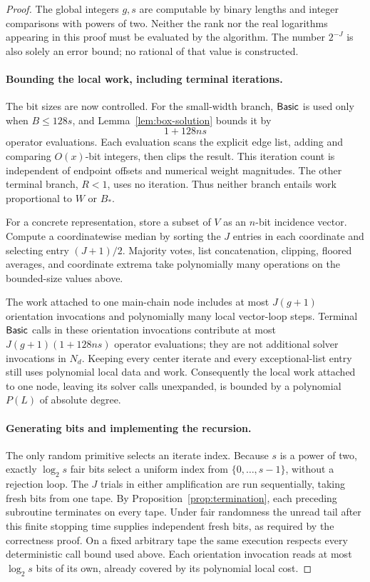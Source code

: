 \begin{proof}
The global integers \(g,s\) are computable by binary lengths and
integer comparisons with powers of two. Neither the rank nor the
real logarithms appearing in this proof must be evaluated by the
algorithm. The number \(2^{-J}\) is also solely an error bound;
no rational of that value is constructed.

\paragraph{Bounding the local work, including terminal iterations.}
The bit sizes are now controlled. For the small-width branch,
\(\mathsf{Basic}\) is used only when \(B\le128s\), and
Lemma~\ref{lem:box-solution} bounds it by
\[
                         1+128ns
\]
operator evaluations. Each evaluation scans the explicit edge list,
adding and comparing \(O(x)\)-bit integers, then clips the result.
This iteration count is independent of endpoint offsets and numerical
weight magnitudes. The other terminal branch, \(R<1\), uses no
iteration. Thus neither branch entails work proportional to \(W\)
or \(B_*\).

For a concrete representation, store a subset of \(V\) as an
\(n\)-bit incidence vector. Compute a coordinatewise median by
sorting the \(J\) entries in each coordinate and selecting entry
\((J+1)/2\). Majority votes, list concatenation, clipping, floored
averages, and coordinate extrema take polynomially many operations
on the bounded-size values above.

The work attached to one main-chain node includes at most
\(J(g+1)\) orientation invocations and polynomially many local
vector-loop steps. Terminal \(\mathsf{Basic}\) calls in these orientation
invocations contribute at most
\(J(g+1)(1+128ns)\) operator evaluations; they are not additional
solver invocations in \(N_d\). Keeping every center iterate and
every exceptional-list entry still uses polynomial local data and
work. Consequently the local work attached to one node, leaving its
solver calls unexpanded, is bounded by a polynomial \(P(L)\) of
absolute degree.

\paragraph{Generating bits and implementing the recursion.}
The only random primitive selects an iterate index. Because \(s\)
is a power of two, exactly \(\log_2s\) fair bits select a uniform
index from \(\{0,\ldots,s-1\}\), without a rejection loop. The
\(J\) trials in either amplification are run sequentially, taking
fresh bits from one tape. By Proposition~\ref{prop:termination},
each preceding subroutine terminates on every tape. Under fair
randomness the unread tail after this finite stopping time supplies
independent fresh bits, as required by the correctness proof. On a
fixed arbitrary tape the same execution respects every deterministic
call bound used above. Each orientation invocation reads at most
\(\log_2s\) bits of its own, already covered by its polynomial
local cost.


\end{proof}
